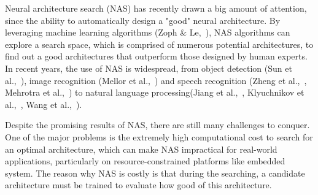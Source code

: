 \documentclass[conference]{IEEEtran}
\begin{document}
    Neural architecture search (NAS) has recently drawn a big amount of 
    attention, since the ability to automatically design a "good" neural 
    architecture. By leveraging machine learning algorithms (Zoph \& Le,\ \cite{https://doi.org/10.48550/arxiv.1611.01578}), 
    NAS algorithms can explore a search space, which is comprised of 
    numerous potential architectures, to find out a good architectures 
    that outperform those designed by human experts. In recent years, 
    the use of NAS is widespread, from object detection (Sun et al.,\ \cite{https://doi.org/10.48550/arxiv.2111.13336}), 
    image recognition (Mellor et al.,\ \cite{https://doi.org/10.48550/arxiv.2006.04647}) 
    and speech recognition (Zheng et al.,\ \cite{https://doi.org/10.48550/arxiv.2011.05649}, 
    Mehrotra et al.,\ \cite{mehrotra2021nasbenchasr}) to 
    natural language processing(Jiang et al.,\ \cite{jiang-etal-2019-improved}, 
    Klyuchnikov et al.,\ \cite{https://doi.org/10.48550/arxiv.2006.07116}, 
    Wang et al.,\ \cite{https://doi.org/10.48550/arxiv.2005.14187}).

    Despite the promising results of NAS, there are still many challenges 
    to conquer. One of the major problems is the extremely high computational 
    cost to search for an optimal architecture, which can make NAS impractical 
    for real-world applications, particularly on resource-constrained 
    platforms like embedded system. The reason why NAS is costly is that 
    during the searching, a candidate architecture must be trained to 
    evaluate how good of this architecture.
\end{document}
